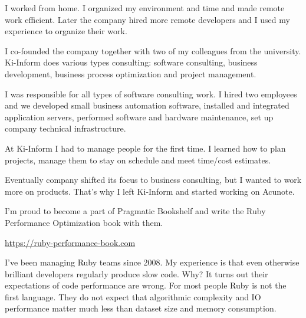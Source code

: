 \documentclass[12pt]{letter}
\begin{document}
\begin{llist}
           \item I worked from home. I organized my environment and time and made remote work efficient. Later the company hired more remote developers and I used my experience to organize their work.

  \endexperience


  \startexperience

           \item I co-founded the company together with two of my colleagues from the university. Ki-Inform does various types consulting: software consulting, business development, business process optimization and project management.

           \item  I was responsible for all types of software consulting work. I hired two employees and we developed small business automation software, installed and integrated application servers, performed software and hardware maintenance, set up company technical infrastructure.

           \item  At Ki-Inform I had to manage people for the first time. I learned how to plan projects, manage them to stay on schedule and meet time/cost estimates.

           \item  Eventually company shifted its focus to business consulting, but I wanted to work more on products. That's why I left Ki-Inform and started working on Acunote.

  \endexperience


  \location{}

  \startexperience
           \item I'm proud to become a part of Pragmatic Bookshelf and write the Ruby Performance Optimization book with them.

           \item \url{https://ruby-performance-book.com}

           \item I've been managing Ruby teams since 2008. My experience is that even otherwise brilliant developers regularly produce slow code. Why? It turns out their expectations of code performance are wrong. For most people Ruby is not the first language. They do not expect that algorithmic complexity and IO performance matter much less than dataset size and memory consumption.


\end{llist}
\end{document}
